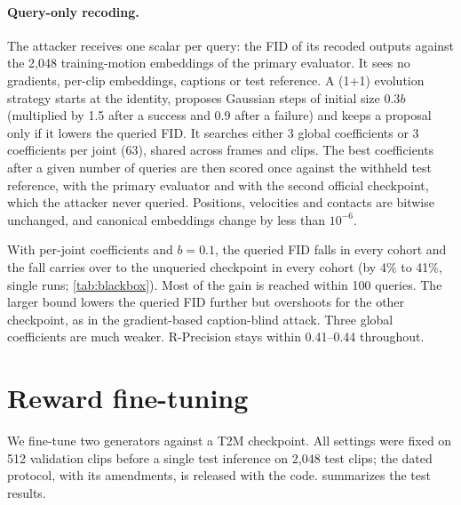 \documentclass[10pt,twocolumn,letterpaper]{article}
\begin{document}


\paragraph{Query-only recoding.} The attacker receives one scalar per query: the FID of its recoded outputs against the 2,048 training-motion embeddings of the primary evaluator. It sees no gradients, per-clip embeddings, captions or test reference. A (1+1) evolution strategy starts at the identity, proposes Gaussian steps of initial size $0.3b$ (multiplied by 1.5 after a success and 0.9 after a failure) and keeps a proposal only if it lowers the queried FID. It searches either 3 global coefficients or 3 coefficients per joint (63), shared across frames and clips. The best coefficients after a given number of queries are then scored once against the withheld test reference, with the primary evaluator and with the second official checkpoint, which the attacker never queried. Positions, velocities and contacts are bitwise unchanged, and canonical embeddings change by less than $10^{-6}$.



With per-joint coefficients and $b=0.1$, the queried FID falls in every cohort and the fall carries over to the unqueried checkpoint in every cohort (by 4\% to 41\%, single runs; \cref{tab:blackbox}). Most of the gain is reached within 100 queries. The larger bound lowers the queried FID further but overshoots for the other checkpoint, as in the gradient-based caption-blind attack. Three global coefficients are much weaker. R-Precision stays within 0.41--0.44 throughout.

\section{Reward fine-tuning}\label{sec:reward}
We fine-tune two generators against a T2M checkpoint. All settings were fixed on 512 validation clips before a single test inference on 2,048 test clips; the dated protocol, with its amendments, is released with the code.  summarizes the test results.
\end{document}
